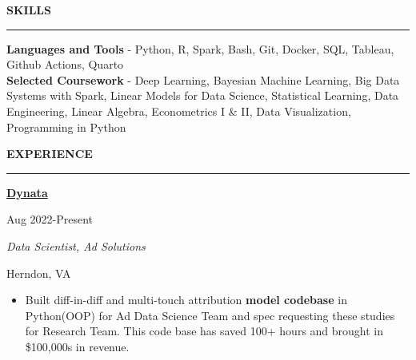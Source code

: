 \documentclass[
  16,
]{article}
\providecommand{\tightlist}{%
  \setlength{\itemsep}{0pt}\setlength{\parskip}{0pt}}\usepackage{longtable,booktabs,array}
\begin{document}
\begin{large}{\bf SKILLS}
  \vspace{3pt}
  \hrule
\end{large}
\vspace{-0.16cm}

\textbf{Languages and Tools} - Python, R, Spark, Bash, Git, Docker, SQL,
Tableau, Github Actions, Quarto\\
\textbf{Selected Coursework} - Deep Learning, Bayesian Machine Learning,
Big Data Systems with Spark, Linear Models for Data Science, Statistical
Learning, Data Engineering, Linear Algebra, Econometrics I \& II, Data
Visualization, Programming in Python

\begin{large}{\bf EXPERIENCE}
  \vspace{3pt}
  \hrule
  \begin{multicols}{2}
    \begin{flushleft}{\bf \href{https://www.dynata.com/}{Dynata}}\end{flushleft}
    \begin{flushright}Aug 2022-Present\end{flushright}
  \end{multicols}
  \vspace{-0.17cm}
  \begin{multicols}{2}
    \begin{flushleft}\textit{Data Scientist, Ad Solutions}\end{flushleft}
    \begin{flushright}Herndon, VA\end{flushright}\end
  {multicols}
\end{large}
\vspace{-0.16cm}

\begin{itemize}
\tightlist
\item
  Built diff-in-diff and multi-touch attribution \textbf{model codebase}
  in Python(OOP) for Ad Data Science Team and spec requesting these
  studies for Research Team. This code base has saved 100+ hours and
  brought in \$100,000s in revenue.
\end{itemize}

\vspace{7pt}
\end{document}
